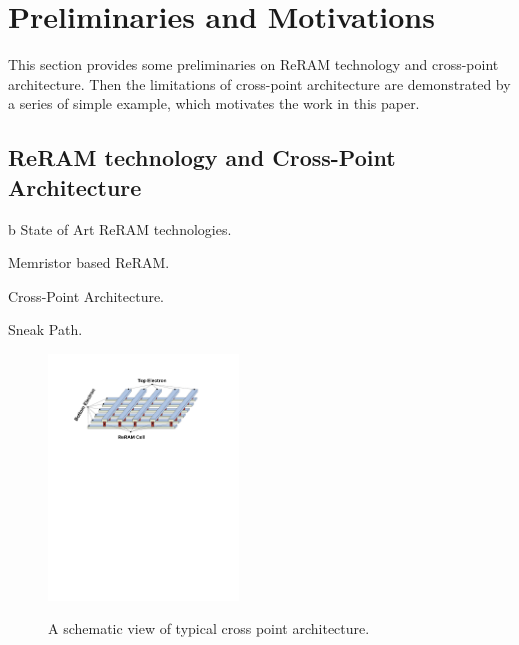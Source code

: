 \vspace{10pt}
\section{Preliminaries and Motivations}

This section provides some preliminaries on ReRAM technology and cross-point architecture. Then the limitations of cross-point architecture are demonstrated by a series of simple example, which motivates the work in this paper.

\subsection{ReRAM technology and Cross-Point Architecture}
b
State of Art ReRAM technologies.

Memristor based ReRAM.

Cross-Point Architecture.

Sneak Path.
\begin{figure}
\centering
  \includegraphics[width=0.45\textwidth]{./figures/crossbar_array.pdf}\\
  \caption{A schematic view of typical cross point architecture.}\label{fig:array}
\end{figure}

